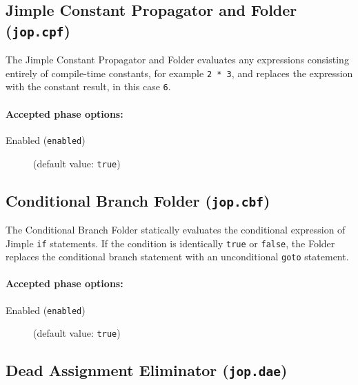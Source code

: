 \documentclass{article}
\begin{document}
\subsection{Jimple Constant Propagator and Folder ({\tt jop.cpf})}

The Jimple Constant Propagator and Folder evaluates any expressions
consisting entirely of compile-time constants, for example {\tt 2
* 3}, and replaces the expression with the constant result,
in this case {\tt 6}.


\paragraph{Accepted phase options:} 

\begin{description}

\item[Enabled ({\tt enabled})]
(default value: {\tt true})






\end{description}

\subsection{Conditional Branch Folder ({\tt jop.cbf})}

The Conditional Branch Folder statically evaluates the
conditional expression of Jimple {\tt if} statements.  If the
condition is identically {\tt true} or
{\tt false}, the Folder replaces the conditional branch
statement with an unconditional {\tt goto} statement.


\paragraph{Accepted phase options:} 

\begin{description}

\item[Enabled ({\tt enabled})]
(default value: {\tt true})






\end{description}

\subsection{Dead Assignment Eliminator ({\tt jop.dae})}
\end{document}
